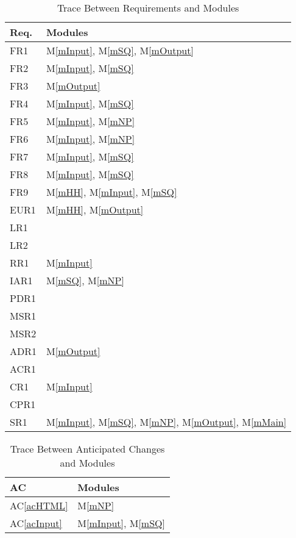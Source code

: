 \documentclass[12pt, titlepage]{article}
\newcommand{\acref}[1]{AC\ref{#1}}
\newcommand{\mref}[1]{M\ref{#1}}
\begin{document}
\begin{table}[H]
\centering
\begin{tabular}{p{} p{}}
\toprule
\textbf{Req.} & \textbf{Modules}\\
\midrule
FR1 & \mref{mInput}, \mref{mSQ}, \mref{mOutput}\\
FR2 & \mref{mInput}, \mref{mSQ}\\
FR3 & \mref{mOutput}\\
FR4 & \mref{mInput}, \mref{mSQ}\\
FR5 & \mref{mInput}, \mref{mNP}\\
FR6 & \mref{mInput}, \mref{mNP}\\
FR7 & \mref{mInput}, \mref{mSQ}\\
FR8 & \mref{mInput}, \mref{mSQ}\\
FR9 & \mref{mHH}, \mref{mInput}, \mref{mSQ}\\
EUR1 & \mref{mHH}, \mref{mOutput}\\
LR1 & \\
LR2 & \\
RR1 & \mref{mInput}\\
IAR1 & \mref{mSQ}, \mref{mNP}\\
PDR1 & \\
MSR1 & \\
MSR2 & \\
ADR1 & \mref{mOutput}\\
ACR1 & \\
CR1 & \mref{mInput}\\
CPR1 & \\
SR1 & \mref{mInput}, \mref{mSQ}, \mref{mNP}, \mref{mOutput}, \mref{mMain}\\
\bottomrule
\end{tabular}
\caption{Trace Between Requirements and Modules}
\label{TblRT}
\end{table}

\begin{table}[H]
\centering
\begin{tabular}{p{} p{}}
\toprule
\textbf{AC} & \textbf{Modules}\\
\midrule
\acref{acHTML} & \mref{mNP}\\
\acref{acInput} & \mref{mInput}, \mref{mSQ}\\
\bottomrule
\end{tabular}
\caption{Trace Between Anticipated Changes and Modules}
\label{TblACT}
\end{table}
\end{document}
